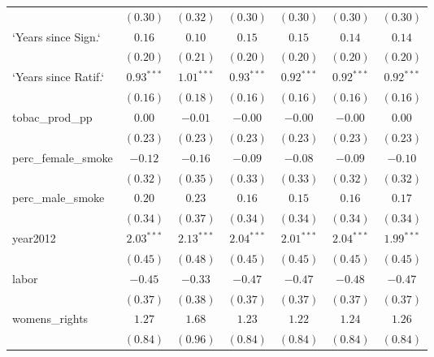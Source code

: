 \begin{table}[!h]
\begin{center}
\begin{tabular}{l c c c c c c }
                        & $(0.30)$     & $(0.32)$     & $(0.30)$     & $(0.30)$     & $(0.30)$     & $(0.30)$     \\
`Years since Sign.`     & $0.16$       & $0.10$       & $0.15$       & $0.15$       & $0.14$       & $0.14$       \\
                        & $(0.20)$     & $(0.21)$     & $(0.20)$     & $(0.20)$     & $(0.20)$     & $(0.20)$     \\
`Years since Ratif.`    & $0.93^{***}$ & $1.01^{***}$ & $0.93^{***}$ & $0.92^{***}$ & $0.92^{***}$ & $0.92^{***}$ \\
                        & $(0.16)$     & $(0.18)$     & $(0.16)$     & $(0.16)$     & $(0.16)$     & $(0.16)$     \\
tobac\_prod\_pp         & $0.00$       & $-0.01$      & $-0.00$      & $-0.00$      & $-0.00$      & $0.00$       \\
                        & $(0.23)$     & $(0.23)$     & $(0.23)$     & $(0.23)$     & $(0.23)$     & $(0.23)$     \\
perc\_female\_smoke     & $-0.12$      & $-0.16$      & $-0.09$      & $-0.08$      & $-0.09$      & $-0.10$      \\
                        & $(0.32)$     & $(0.35)$     & $(0.33)$     & $(0.33)$     & $(0.32)$     & $(0.32)$     \\
perc\_male\_smoke       & $0.20$       & $0.23$       & $0.16$       & $0.15$       & $0.16$       & $0.17$       \\
                        & $(0.34)$     & $(0.37)$     & $(0.34)$     & $(0.34)$     & $(0.34)$     & $(0.34)$     \\
year2012                & $2.03^{***}$ & $2.13^{***}$ & $2.04^{***}$ & $2.01^{***}$ & $2.04^{***}$ & $1.99^{***}$ \\
                        & $(0.45)$     & $(0.48)$     & $(0.45)$     & $(0.45)$     & $(0.45)$     & $(0.45)$     \\
labor                   & $-0.45$      & $-0.33$      & $-0.47$      & $-0.47$      & $-0.48$      & $-0.47$      \\
                        & $(0.37)$     & $(0.38)$     & $(0.37)$     & $(0.37)$     & $(0.37)$     & $(0.37)$     \\
womens\_rights          & $1.27$       & $1.68$       & $1.23$       & $1.22$       & $1.24$       & $1.26$       \\
                        & $(0.84)$     & $(0.96)$     & $(0.84)$     & $(0.84)$     & $(0.84)$     & $(0.84)$     \\

\end{tabular}
\end{center}
\end{table}

